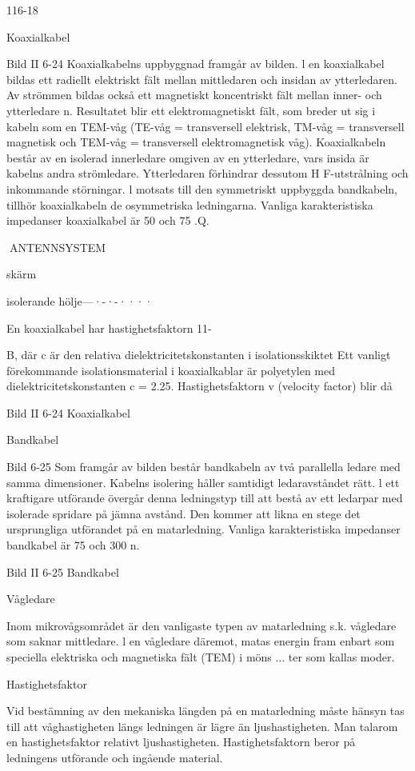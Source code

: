 {{116-18

Koaxialkabel

Bild II 6-24
Koaxialkabelns uppbyggnad framgår av bilden. l en koaxialkabel bildas ett radiellt
elektriskt fält mellan mittledaren och insidan
av ytterledaren. Av strömmen bildas också
ett magnetiskt koncentriskt fält mellan inner- och ytterledare n. Resultatet blir ett elektromagnetiskt fält, som breder ut sig i kabeln
som en TEM-våg (TE-våg = transversell
elektrisk, TM-våg = transversell magnetisk
och TEM-våg = transversell elektromagnetisk våg).
Koaxialkabeln består av en isolerad innerledare omgiven av en ytterledare, vars insida är kabelns andra strömledare. Ytterledaren förhindrar dessutom H F-utstrålning
och inkommande störningar. l motsats till
den symmetriskt uppbyggda bandkabeln,
tillhör koaxialkabeln de osymmetriska ledningarna.
Vanliga karakteristiska impedanser
koaxialkabel är 50 och 75 .Q.

ANTENNSYSTEM

skärm

isolerande hölje---·-·-····

En koaxialkabel har hastighetsfaktorn
11-{B, där c är den relativa dielektricitetskonstanten i isolationsskiktet Ett vanligt förekommande isolationsmaterial i koaxialkablar är polyetylen med dielektricitetskonstanten c = 2.25.
Hastighetsfaktorn v (velocity factor) blir
då

Bild II 6-24 Koaxialkabel

Bandkabel

Bild 6-25
Som framgår av bilden består bandkabeln
av två parallella ledare med samma dimensioner. Kabelns isolering håller samtidigt
ledaravståndet rätt. l ett kraftigare utförande
övergår denna ledningstyp till att bestå av
ett ledarpar med isolerade spridare på jämna
avstånd. Den kommer att likna en stege det ursprungliga utförandet på en matarledning.
Vanliga karakteristiska impedanser
bandkabel är 75 och 300 n.

Bild II 6-25 Bandkabel

Vågledare

Inom mikrovågsområdet är den vanligaste
typen av matarledning s.k. vågledare som
saknar mittledare. l en vågledare däremot,
matas energin fram enbart som speciella
elektriska och magnetiska fält (TEM) i möns ...
ter som kallas moder.

Hastighetsfaktor

Vid bestämning av den mekaniska längden
på en matarledning måste hänsyn tas till att
våghastigheten längs ledningen är lägre än
ljushastigheten. Man talarom en hastighetsfaktor relativt ljushastigheten. Hastighetsfaktorn beror på ledningens utförande och
ingående material.

}}}
